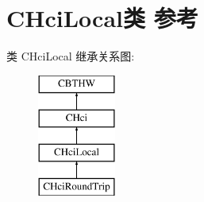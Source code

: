 \hypertarget{class_c_hci_local}{}\section{C\+Hci\+Local类 参考}
\label{class_c_hci_local}
类 C\+Hci\+Local 继承关系图\+:\begin{figure}[H]
\begin{center}
\leavevmode
\includegraphics[height=4.000000cm]{class_c_hci_local}
\end{center}
\end{figure}
